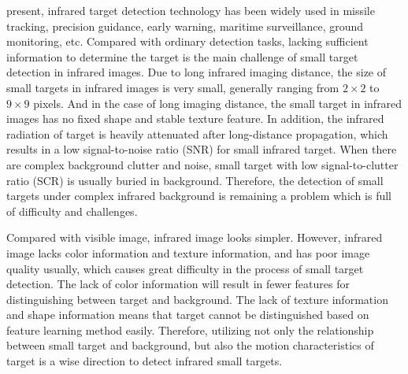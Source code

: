 \documentclass[journal]{IEEEtran}
\begin{document}
 present, infrared target detection technology has been widely used in missile tracking, precision guidance, early warning, maritime surveillance, ground monitoring\cite{luo2015space,dawson2010space,li2014infrared}, etc. Compared with ordinary detection tasks, lacking sufficient information to determine the target is the main challenge of small target detection in infrared images. Due to long infrared imaging distance, the size of small targets in infrared images is very small, generally ranging from $2\times2$ to $9\times9$ pixels\cite{wang2017infrared}. And in the case of long imaging distance, the small target in infrared images has no fixed shape and stable texture feature. In addition, the infrared radiation of target is heavily attenuated after long-distance propagation, which results in a low signal-to-noise ratio (SNR) for small infrared target\cite{li2016novel}. When there are complex background clutter and noise, small target with low signal-to-clutter ratio (SCR) is usually buried in background. Therefore, the detection of small targets under complex infrared background is remaining a problem which is full of difficulty and challenges.

Compared with visible image, infrared image looks simpler. However, infrared image lacks color information and texture information, and has poor image quality usually, which causes great difficulty in the process of small target detection. The lack of color information will result in fewer features for distinguishing between target and background. The lack of texture information and shape information means that target cannot be distinguished based on feature learning method easily. Therefore, utilizing not only the relationship between small target and background, but also the motion characteristics of target is a wise direction to detect infrared small targets.
\end{document}
